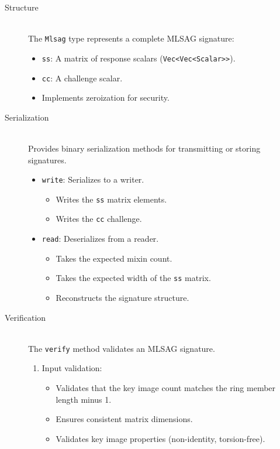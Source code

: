 \documentclass[12pt,a4paper]{article}
\begin{document}
\begin{description}
\item[Structure] \hfill \\
The \texttt{Mlsag} type represents a complete MLSAG signature:
\begin{itemize}
  \item \texttt{ss}: A matrix of response scalars (\texttt{Vec<Vec<Scalar>>}).
  \item \texttt{cc}: A challenge scalar.
  \item Implements zeroization for security.
\end{itemize}

\item[Serialization] \hfill \\
Provides binary serialization methods for transmitting or storing signatures.
\begin{itemize}
  \item \texttt{write}: Serializes to a writer.
    \begin{itemize}
      \item Writes the \texttt{ss} matrix elements.
      \item Writes the \texttt{cc} challenge.
    \end{itemize}

  \item \texttt{read}: Deserializes from a reader.
    \begin{itemize}
      \item Takes the expected mixin count.
      \item Takes the expected width of the \texttt{ss} matrix.
      \item Reconstructs the signature structure.
    \end{itemize}
\end{itemize}

\item[Verification] \hfill \\
The \texttt{verify} method validates an MLSAG signature.
\begin{enumerate}
  \item Input validation:
    \begin{itemize}
      \item Validates that the key image count matches the ring member length minus 1.
      \item Ensures consistent matrix dimensions.
      \item Validates key image properties (non-identity, torsion-free).
    \end{itemize}


\end{enumerate}
\end{description}
\end{document}
